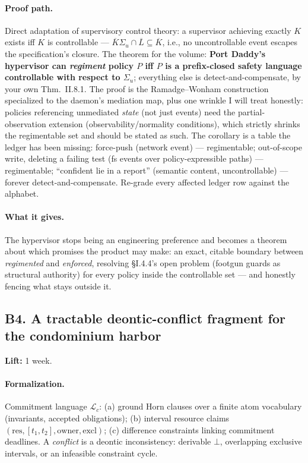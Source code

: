 \documentclass[11pt,a4paper]{article}
\newcommand{\lift}[1]{\noindent\textbf{Lift:} #1.}
\newcommand{\gives}{\paragraph{What it gives.}}
\newcommand{\form}{\paragraph{Formalization.}}
\newcommand{\proofpath}{\paragraph{Proof path.}}
\begin{document}
\proofpath Direct adaptation of supervisory control theory: a supervisor achieving exactly $K$ exists iff $K$ is controllable --- $\overline{K}\Sigma_u \cap \overline{L} \subseteq \overline{K}$, i.e., no uncontrollable event escapes the specification's closure. The theorem for the volume: \textbf{Port Daddy's hypervisor can \emph{regiment} policy $P$ iff $P$ is a prefix-closed safety language controllable with respect to $\Sigma_u$}; everything else is detect-and-compensate, by your own Thm.~II.8.1. The proof is the Ramadge--Wonham construction specialized to the daemon's mediation map, plus one wrinkle I will treat honestly: policies referencing unmediated \emph{state} (not just events) need the partial-observation extension (observability/normality conditions), which strictly shrinks the regimentable set and should be stated as such. The corollary is a table the ledger has been missing: force-push (network event) --- regimentable; out-of-scope write, deleting a failing test (fs events over policy-expressible paths) --- regimentable; ``confident lie in a report'' (semantic content, uncontrollable) --- forever detect-and-compensate. Re-grade every affected ledger row against the alphabet.

\gives The hypervisor stops being an engineering preference and becomes a theorem about which promises the product may make: an exact, citable boundary between \emph{regimented} and \emph{enforced}, resolving \S I.4.4's open problem (footgun guards as structural authority) for every policy inside the controllable set --- and honestly fencing what stays outside it.

\subsection{B4. A tractable deontic-conflict fragment for the condominium harbor}
\lift{1 week}

\form Commitment language $\mathcal{L}_c$: (a) ground Horn clauses over a finite atom vocabulary (invariants, accepted obligations); (b) interval resource claims $(\mathrm{res}, [t_1,t_2], \mathrm{owner}, \mathrm{excl})$; (c) difference constraints linking commitment deadlines. A \emph{conflict} is a deontic inconsistency: derivable $\bot$, overlapping exclusive intervals, or an infeasible constraint cycle.
\end{document}
